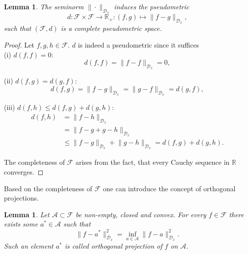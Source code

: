 \documentclass[11pt, a4paper]{article}
\newtheorem{lemma}[theorem]{Lemma}
\newcommand{\R}{\mathbb{R}}
\newcommand{\A}{\mathcal{A}}
\newcommand{\D}{\mathcal{D}}
\newcommand{\F}{\mathcal{F}}
\begin{document}
\begin{lemma}
The seminorm $\| \cdot \|_{\D_x}$ induces the pseudometric
\[ d: \F \times \F \to \R_+ : (f,g) \mapsto \big \| f-g \big \|_{\D_x}, \]
such that $(\F,d)$ is a complete pseudometric space.
\end{lemma}

\begin{proof}
Let $f,g,h \in \F$. $d$ is indeed a pseudometric since it suffices \\

(i) $d(f,f) = 0$:
\[ d(f,f) = \big \| f - f \big \|_{\D_x} = 0, \]

(ii) $d(f,g) = d(g,f)$:
\[ d(f,g) = \big \| f - g \big \|_{\D_x} = \big \| g - f \big \|_{\D_x} = d(g,f), \]

(iii) $d(f,h) \le d(f,g) + d(g,h)$:
\[ \begin{split} 
d(f,h) &= \big \| f - h \big \|_{\D_x} \\\ &= \big \| f - g + g - h \big \|_{\D_x} \\\ &\le \big \| f - g  \big \|_{\D_x} + \big \| g - h \big \|_{\D_x} = d(f,g) + d(g,h). \end{split} \]

The completeness of $\F$ arises from the fact, that every Cauchy sequence in $\R$ converges.
\end{proof}

Based on the completeness of $\F$ one can introduce the concept of orthogonal projections.

\begin{lemma} \label{lem:projection}
Let $\A \subset \F$ be non-empty, closed and convex. For every $f \in \F$ there exists some $a^* \in \A$ such that 
\[ \big \| f - a^* \big \|_{\D_x}^2 = \inf_{a \in \A} \big \| f - a \big \|_{\D_x}^2. \]
Such an element $a^*$ is called orthogonal projection of $f$ on $\A$.
\end{lemma}
\end{document}
